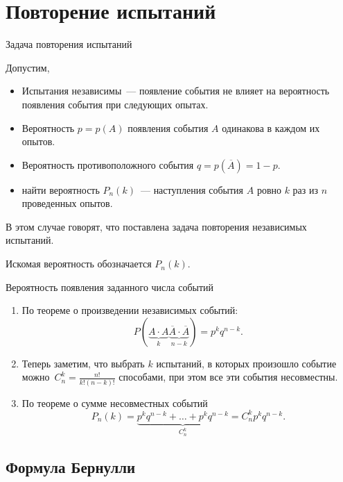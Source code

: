\documentclass[unicode,11pt,notheorems,xcolor=table]{beamer}
\begin{document}
\section{Повторение испытаний}
\begin{frame}{Задача повторения испытаний}{}

    Допустим, 
    \begin{itemize}
        \item Испытания независимы~--- появление события не влияет на вероятность появления события при следующих опытах.
        \item Вероятность $p=p(A)$ появления события $A$ одинакова в каждом их опытов.
        \item Вероятность противоположного события $q=p(\overline{A})=1-p$.
        \item {} найти вероятность $P_n(k)$~--- наступления события $A$  ровно $k$ раз из $n$ проведенных опытов.
    \end{itemize}
    

    В этом случае говорят, что поставлена \alert{задача повторения независимых испытаний.}

    Искомая вероятность обозначается $P_n(k)$.
\end{frame}
\begin{frame}{Вероятность появления заданного числа событий}{}
    
    \begin{enumerate}
        \item По теореме о произведении независимых событий:
        $$
            P(\underbrace{A\cdot A}_k \underbrace{\overline{A} \cdot \overline{A}}_{n-k})= p^k q^{n-k}.
        $$
        \item Теперь заметим, что выбрать $k$ испытаний, в которых произошло событие можно~$C_n^k = \frac{n!}{k!(n-k)!}$ способами, при этом все эти события несовместны.
        \item  По теореме о сумме несовместных событий
        $$
            P_n(k)= \underbrace{p^k q^{n-k} + \ldots + p^k q^{n-k}}_{C_n^k}  = C_n^k p^k q^{n-k}. 
        $$


    \end{enumerate}
\end{frame}

\subsection{Формула Бернулли}
\end{document}
